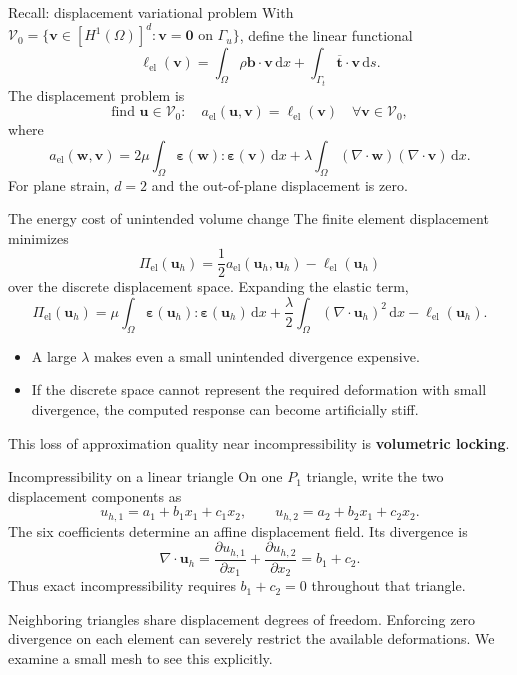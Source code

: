 \documentclass[11pt,aspectratio=169]{beamer}
\newcommand{\bu}{\bm u}
\newcommand{\bv}{\bm v}
\newcommand{\bw}{\bm w}
\newcommand{\bb}{\bm b}
\newcommand{\bt}{\bm t}
\newcommand{\beps}{\bm\varepsilon}
\newcommand{\Om}{\Omega}
\newcommand{\Vzero}{\mathcal V_0}
\newcommand{\dd}{\,\mathrm d}
\newcommand{\divg}{\nabla\!\cdot}
\begin{document}
\begin{frame}{Recall: displacement variational problem}
With $\Vzero=\{\bv\in[H^1(\Om)]^d:\bv=\bm0\text{ on }\Gamma_u\}$,
define the linear functional
\[
\ell_{\mathrm{el}}(\bv)=\int_\Om\rho\bb\cdot\bv\dd x
+\int_{\Gamma_t}\overline{\bt}\cdot\bv\dd s.
\]
The displacement problem is
\[
\boxed{\text{find }\bu\in\Vzero:\quad
a_{\mathrm{el}}(\bu,\bv)=\ell_{\mathrm{el}}(\bv)
\quad\forall\bv\in\Vzero,}
\]
where
\[
a_{\mathrm{el}}(\bw,\bv)
=2\mu\int_\Om\beps(\bw):\beps(\bv)\dd x
+\lambda\int_\Om(\divg\bw)(\divg\bv)\dd x.
\]
For plane strain, $d=2$ and the out-of-plane displacement is zero.
\end{frame}

\begin{frame}{The energy cost of unintended volume change}
The finite element displacement minimizes
\[
\Pi_{\mathrm{el}}(\bu_h)
=\frac12a_{\mathrm{el}}(\bu_h,\bu_h)-\ell_{\mathrm{el}}(\bu_h)
\]
over the discrete displacement space. Expanding the elastic term,
\[
\Pi_{\mathrm{el}}(\bu_h)
=\mu\int_\Om\beps(\bu_h):\beps(\bu_h)\dd x
+\frac{\lambda}{2}\int_\Om(\divg\bu_h)^2\dd x
-\ell_{\mathrm{el}}(\bu_h).
\]
\begin{itemize}
\item A large $\lambda$ makes even a small unintended divergence expensive.
\item If the discrete space cannot represent the required deformation with
small divergence, the computed response can become artificially stiff.
\end{itemize}
This loss of approximation quality near incompressibility is
\textbf{volumetric locking}.
\end{frame}

\begin{frame}{Incompressibility on a linear triangle}
On one $P_1$ triangle, write the two displacement components as
\[
u_{h,1}=a_1+b_1x_1+c_1x_2,\qquad
u_{h,2}=a_2+b_2x_1+c_2x_2.
\]
The six coefficients determine an affine displacement field. Its divergence is
\[
\divg\bu_h
=\frac{\partial u_{h,1}}{\partial x_1}
+\frac{\partial u_{h,2}}{\partial x_2}
=b_1+c_2.
\]
Thus exact incompressibility requires $b_1+c_2=0$ throughout that triangle.

Neighboring triangles share displacement degrees of freedom. Enforcing
zero divergence on each element can severely restrict the available
deformations. We examine a small mesh to see this explicitly.
\end{frame}
\end{document}
